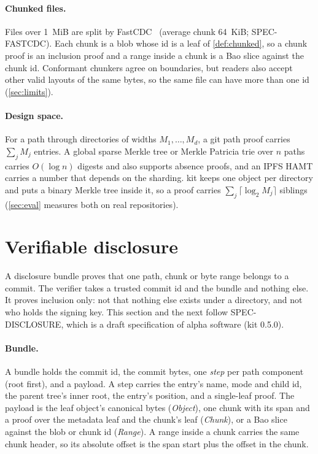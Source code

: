 \documentclass[10pt,letterpaper]{article}
\theoremstyle{remark}
\newcommand{\kit}{\textsf{kit}}
\begin{document}
\paragraph{Chunked files.}
Files over 1~MiB are split by FastCDC~\cite{fastcdc} (average chunk 64~KiB;
SPEC-FASTCDC). Each chunk is a blob whose id is a leaf of
\cref{def:chunked}, so a chunk proof is an inclusion proof and a range inside a
chunk is a Bao slice against the chunk id. Conformant chunkers agree on
boundaries, but readers also accept other valid layouts of the same bytes, so
the same file can have more than one id (\cref{sec:limits}).

\paragraph{Design space.}
For a path through directories of widths $M_1, \dots, M_d$, a git path proof
carries $\sum_j M_j$ entries. A global sparse Merkle tree or Merkle Patricia
trie over $n$ paths carries $O(\log n)$ digests and also supports absence
proofs, and an IPFS HAMT carries a number that depends on the sharding. \kit{}
keeps one object per directory and puts a binary Merkle tree inside it, so a
proof carries $\sum_j \lceil\log_2 M_j\rceil$ siblings (\cref{sec:eval}
measures both on real repositories).

\section{Verifiable disclosure}\label{sec:disclosure}

A disclosure bundle proves that one path, chunk or byte range belongs to a
commit. The verifier takes a trusted commit id and the bundle and nothing
else. It proves inclusion only: not that nothing else exists under a
directory, and not who holds the signing key. This section and the next follow
SPEC-DISCLOSURE, which is a draft specification of alpha software (\kit{}
0.5.0).

\paragraph{Bundle.}
A bundle holds the commit id, the commit bytes, one \emph{step} per path
component (root first), and a payload. A step carries the
entry's name, mode and child id, the parent tree's inner root, the entry's
position, and a single-leaf proof. The payload is the leaf object's canonical
bytes (\emph{Object}), one chunk with its span and a proof over the metadata leaf
and the chunk's leaf (\emph{Chunk}), or a Bao slice against the blob or chunk id
(\emph{Range}). A range inside a chunk carries the same chunk header, so its
absolute offset is the span start plus the offset in the chunk.
\end{document}
